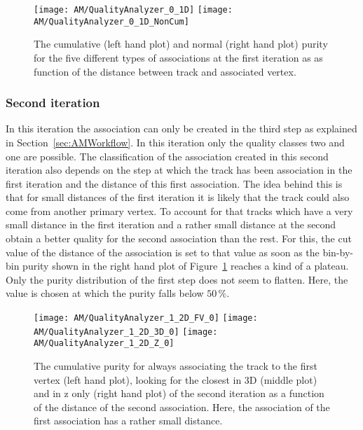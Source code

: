 \begin{figure}[!ht]
  \centering
  \texttt{[image: AM/QualityAnalyzer\_0\_1D]}
  \texttt{[image: AM/QualityAnalyzer\_0\_1D\_NonCum]}
  \caption[Cumulative and normal purity of iteration one vs distance to define quality]{The cumulative (left hand plot) and normal (right hand plot) purity for the five different types of associations at the first iteration as as function of the distance between track and associated vertex.\label{plot:AMWFQualityI1}}
\end{figure}



\subsubsection{Second iteration}

In this iteration the association can only be created in the third step as explained in Section~\ref{sec:AMWorkflow}. In this iteration only the quality classes two and one are possible. The classification of the association created in this second iteration also depends on the step at which the track has been association in the first iteration and the distance of this first association. The idea behind this is that for small distances of the first iteration it is likely that the track could also come from another primary vertex. To account for that tracks which have a very small distance in the first iteration and a rather small distance at the second obtain a better quality for the second association than the rest. For this, the cut value of the distance of the association is set to that value as soon as the bin-by-bin purity shown in the right hand plot of Figure~\ref{plot:AMWFQualityI1} reaches a kind of a plateau. Only the purity distribution of the first step does not seem to flatten. Here, the value is chosen at which the purity falls below $50\,\%$.

\begin{figure}[!ht]
  \centering
  \texttt{[image: AM/QualityAnalyzer\_1\_2D\_FV\_0]}
  \texttt{[image: AM/QualityAnalyzer\_1\_2D\_3D\_0]}
  \texttt{[image: AM/QualityAnalyzer\_1\_2D\_Z\_0]}
  \caption[Cumulative purity of iteration two vs relative difference to define quality for smaller distances of association one]{The cumulative purity for always associating the track to the first vertex (left hand plot), looking for the closest in 3D (middle plot) and in z only (right hand plot) of the second iteration as a function of the distance of the second association. Here, the association of the first association has a rather small distance. \label{plot:AMWFQualityI20}}
\end{figure}

